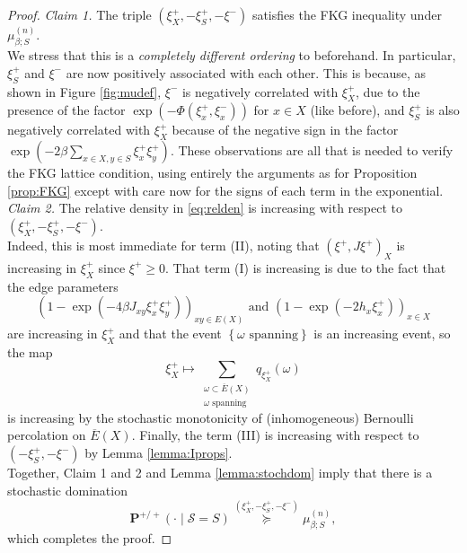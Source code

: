 \documentclass{article}
\numberwithin{equation}{section}
\theoremstyle{definition}
\theoremstyle{definition}
\theoremstyle{remark}
\newcommand{\w}{\omega}
\newcommand{\I}{\Phi}
\renewcommand{\P}{\mathrm{\mathbf{P}}}
\renewcommand{\L}{\xi}
\renewcommand{\S}{\mathcal{S}}
\begin{document}
\begin{proof}
	\noindent\emph{Claim 1. } The triple $(\L^+_X,-\L^+_S,-\L^-)$ satisfies the FKG inequality under $\mu_{\beta;S}^{(n)}$.
	\\[1em]
	We stress that this is a \emph{completely different ordering} to beforehand. In particular, $\L^+_S$ and $\L^-$ are now positively associated with each other. This is because, as shown in Figure \ref{fig:mudef}, $\L^-$ is negatively correlated with $\L^+_X$, due to the presence of the factor $\exp(-\I(\L^+_x,\L^-_x))$ for $x \in X$ (like before), and $\L^+_S$ is also negatively correlated with $\L^+_X$ because of the negative sign in the factor $\exp( - 2\beta\sum_{x \in X, y \in S} \L^+_x \L^+_y)$.
	These observations are all that is needed to verify the FKG lattice condition, using entirely the arguments as for Proposition \ref{prop:FKG} except with care now for the signs of each term in the exponential. 
	\\[1em]
	\noindent\emph{Claim 2. }The relative density in \eqref{eq:relden} is increasing with respect to $(\L^+_X,-\L^+_S,-\L^-)$.
	\\[1em]
	Indeed, this is most immediate for term (II), noting that $(\L^+,J\L^+)_X$ is increasing in $\L^+_X$ since $\L^+ \geq 0$. That term (I) is increasing is due to the fact that the edge parameters
	\[
		(1 - \exp( -4 \beta J_{xy} \L^+_x \L^+_y))_{xy \in E(X)} \text{ and } (1 - \exp( - 2h_x \L^+_x))_{x \in X}
	\] 
	are increasing in $\L^+_X$ and that the event $\left\{  \w \text{ spanning} \right\}$ is an increasing event, so the map
	\[
	\L^+_X \mapsto \sum_{\substack{\w \subset \overline{E}(X) \\ \w \text{ spanning}}} q_{\L^+_X}(\w)
	\] 
	is increasing by the stochastic monotonicity of (inhomogeneous) Bernoulli percolation on $ \overline{E}(X)$.
	Finally, the term (III) is increasing with respect to $(-\L^+_S,-\L^-)$ by Lemma \ref{lemma:Iprops}.
	\\[1em]
	Together, Claim 1 and 2 and Lemma \ref{lemma:stochdom} imply that there is a stochastic domination
	\[
		\P^{+ / +}(\cdot \mid \S = S) \overset{(\L^+_X,-\L^+_S,-\L^-)}{\succeq} \mu_{\beta;S}^{(n)},
	\] 
	which completes the proof.
\end{proof}
\end{document}
